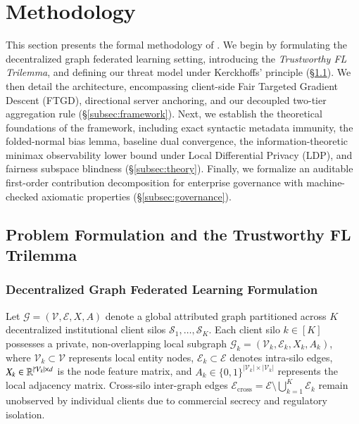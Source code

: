 \section{Methodology}
\label{sec:methodology}

This section presents the formal methodology of \MethodName{}. We begin by formulating the decentralized graph federated learning setting, introducing the \emph{Trustworthy FL Trilemma}, and defining our threat model under Kerckhoffs' principle (\S\ref{subsec:problem_formulation}). We then detail the \MethodName{} architecture, encompassing client-side Fair Targeted Gradient Descent (FTGD), directional server anchoring, and our decoupled two-tier aggregation rule (\S\ref{subsec:framework}). Next, we establish the theoretical foundations of the framework, including exact syntactic metadata immunity, the folded-normal bias lemma, baseline dual convergence, the information-theoretic minimax observability lower bound under Local Differential Privacy (LDP), and fairness subspace blindness (\S\ref{subsec:theory}). Finally, we formalize an auditable first-order contribution decomposition for enterprise governance with machine-checked axiomatic properties (\S\ref{subsec:governance}).

\subsection{Problem Formulation and the Trustworthy FL Trilemma}
\label{subsec:problem_formulation}

\subsubsection{Decentralized Graph Federated Learning Formulation}
Let $\mathcal{G} = (\mathcal{V}, \mathcal{E}, X, A)$ denote a global attributed graph partitioned across $K$ decentralized institutional client silos $\mathcal{S}_1, \dots, \mathcal{S}_K$. Each client silo $k \in [K]$ possesses a private, non-overlapping local subgraph $\mathcal{G}_k = (\mathcal{V}_k, \mathcal{E}_k, X_k, A_k)$, where $\mathcal{V}_k \subset \mathcal{V}$ represents local entity nodes, $\mathcal{E}_k \subset \mathcal{E}$ denotes intra-silo edges, $X_k \in \mathbb{R}^{|\mathcal{V}_k| \times d}$ is the node feature matrix, and $A_k \in \{0, 1\}^{|\mathcal{V}_k| \times |\mathcal{V}_k|}$ represents the local adjacency matrix. Cross-silo inter-graph edges $\mathcal{E}_{\mathrm{cross}} = \mathcal{E} \setminus \bigcup_{k=1}^K \mathcal{E}_k$ remain unobserved by individual clients due to commercial secrecy and regulatory isolation.

